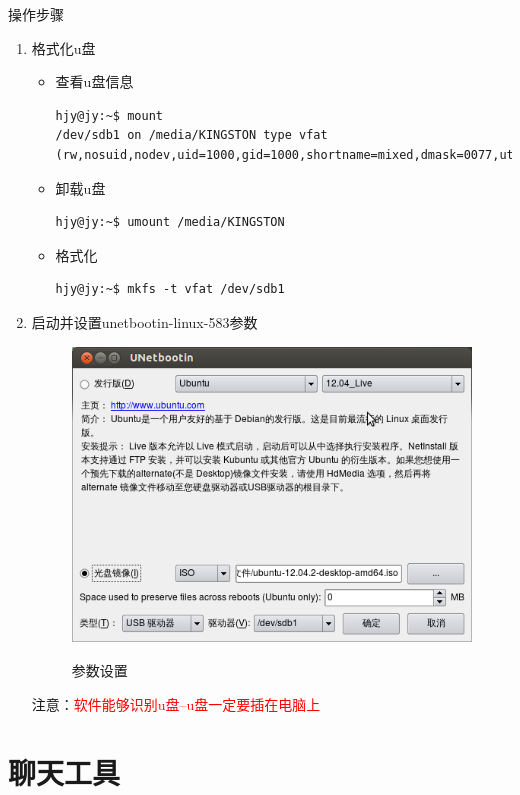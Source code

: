 操作步骤
\begin{enumerate}
\item 格式化u盘
\begin{itemize}
\item 查看u盘信息
\begin{lstlisting}[style=BASH]
hjy@jy:~$ mount
/dev/sdb1 on /media/KINGSTON type vfat (rw,nosuid,nodev,uid=1000,gid=1000,shortname=mixed,dmask=0077,utf8=1,showexec,flush,uhelper=udisks)
\end{lstlisting}

\item 卸载u盘
\begin{lstlisting}[style=BASH]
hjy@jy:~$ umount /media/KINGSTON
\end{lstlisting}

\item 格式化
\begin{lstlisting}[style=BASH]
hjy@jy:~$ mkfs -t vfat /dev/sdb1
\end{lstlisting}
\end{itemize}
\item 启动并设置unetbootin-linux-583参数\\
\begin{figure}[!htbp]
	\centering
	\caption{参数设置}  
		\includegraphics[scale=0.35]{figs/unetbootin_set.png}
    	\label{fig:unetbootin_set}
\end{figure}
注意：\textcolor{red}{软件能够识别u盘--u盘一定要插在电脑上}
\end{enumerate}
\clearpage

\section{聊天工具}
